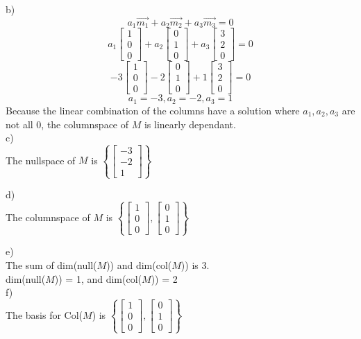 \documentclass[12pt]{article}
\newcommand{\sqbrl}{\left[}
\newcommand{\sqbrr}{\right]}
\begin{document}
b)\\
	\[a_1\vec{m_1} + a_2\vec{m_2} + a_3\vec{m_3} = 0\]
	\[a_1\sqbrl\begin{matrix}1\\0\\0\end{matrix}\sqbrr + a_2\sqbrl\begin{matrix}0\\1\\0\end{matrix}\sqbrr + a_3\sqbrl\begin{matrix}3\\2\\0\end{matrix}\sqbrr = 0\]
	\[-3\sqbrl\begin{matrix}1\\0\\0\end{matrix}\sqbrr -2\sqbrl\begin{matrix}0\\1\\0\end{matrix}\sqbrr + 1\sqbrl\begin{matrix}3\\2\\0\end{matrix}\sqbrr = 0\]
\[a_1 = -3, a_2 = -2, a_3 = 1\] 
Because the linear combination of the columns have a solution where $a_1, a_2, a_3$ are not all 0, the columnspace of $M$ is linearly dependant.\\

c)\\
The nullspace of $M$ is $\left\{\sqbrl\begin{matrix}-3\\-2\\1\end{matrix}\sqbrr\right\}$

d)\\
The columnspace of $M$ is $\left\{\sqbrl\begin{matrix}1\\0\\0\end{matrix}\sqbrr, \sqbrl\begin{matrix}0\\1\\0\end{matrix}\sqbrr\right\}$

e)\\
The sum of dim(null($M$)) and dim(col($M$)) is 3.\\
dim(null($M$)) = 1, and dim(col($M$)) = 2\\
f)\\
The basis for Col($M$) is $\left\{\sqbrl\begin{matrix}1\\0\\0\end{matrix}\sqbrr, \sqbrl\begin{matrix}0\\1\\0\end{matrix}\sqbrr\right\}$
\end{document}
